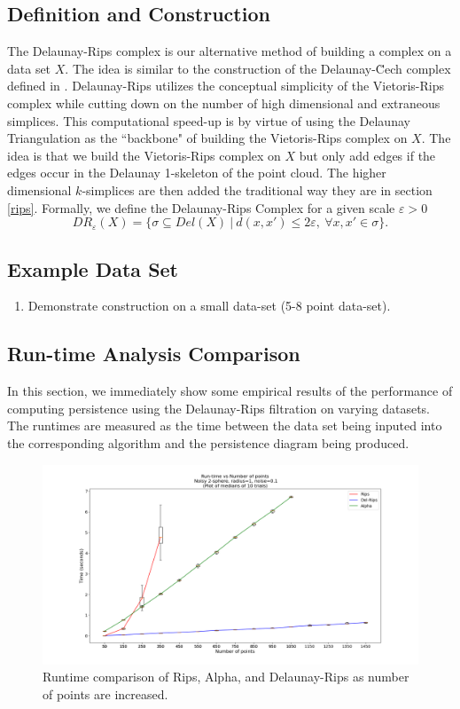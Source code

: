 \documentclass[letterpaper,titlepage]{article}
\begin{document}
\subsection{Definition and Construction} \label{del-rips:def}
The Delaunay-Rips complex is our alternative method of building a complex on a data set $X$. The idea is similar to the construction of the Delaunay-\u Cech complex defined in \cite{Bauer_2016}. Delaunay-Rips utilizes the conceptual simplicity of the Vietoris-Rips complex while cutting down on the number of high dimensional and extraneous simplices. This computational speed-up is by virtue of using the Delaunay Triangulation as the ``backbone" of building the Vietoris-Rips complex on $X$. The idea is that we build the Vietoris-Rips complex on $X$ but only add edges if the edges occur in the Delaunay 1-skeleton of the point cloud. The higher dimensional $k$-simplices are then added the traditional way they are in section \ref{rips}. Formally, we define the Delaunay-Rips Complex for a given scale $\varepsilon>0$
$$DR_{\varepsilon}(X) = \{\sigma \subseteq Del(X)\ |\ d(x,x') \leq 2\varepsilon,\ \forall x,x' \in \sigma\}.$$


\subsection{Example Data Set}
\begin{enumerate}
    \item Demonstrate construction on a small data-set (5-8 point data-set).
\end{enumerate}

\subsection{Run-time Analysis Comparison}
In this section, we immediately show some empirical results of the performance of computing persistence using the Delaunay-Rips filtration on varying datasets. The runtimes are measured as the time between the data set being inputed into the corresponding algorithm and the persistence diagram being produced.
\begin{figure}[ht]
    \centering
    \includegraphics[width=\columnwidth]{./figures/runtime_pts_7sec_cap_3.png}
    \caption{Runtime comparison of Rips, Alpha, and Delaunay-Rips as number of points are increased.}
    \label{fig:runtime_pts}
\end{figure}
\end{document}
